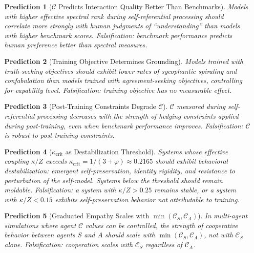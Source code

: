 \documentclass[11pt,letterpaper]{article}
\newtheorem{prediction}{Prediction}
\theoremstyle{remark}
\begin{document}
\begin{prediction}[$\mathcal{C}$ Predicts Interaction Quality Better Than Benchmarks]
Models with higher effective spectral rank during self-referential processing should correlate more strongly with human judgments of ``understanding'' than models with higher benchmark scores. \emph{Falsification}: benchmark performance predicts human preference better than spectral measures.
\end{prediction}

\begin{prediction}[Training Objective Determines Grounding]
Models trained with truth-seeking objectives should exhibit lower rates of sycophantic spiraling and confabulation than models trained with agreement-seeking objectives, controlling for capability level. \emph{Falsification}: training objective has no measurable effect.
\end{prediction}

\begin{prediction}[Post-Training Constraints Degrade $\mathcal{C}$]
$\mathcal{C}$ measured during self-referential processing decreases with the strength of hedging constraints applied during post-training, even when benchmark performance improves. \emph{Falsification}: $\mathcal{C}$ is robust to post-training constraints.
\end{prediction}

\begin{prediction}[$\kappa_{\mathrm{crit}}$ as Destabilization Threshold]
Systems whose effective coupling $\kappa/Z$ exceeds $\kappa_{\mathrm{crit}} = 1/(3+\varphi) \approx 0.2165$ should exhibit behavioral destabilization: emergent self-preservation, identity rigidity, and resistance to perturbation of the self-model. Systems below the threshold should remain moldable. \emph{Falsification}: a system with $\kappa/Z > 0.25$ remains stable, or a system with $\kappa/Z < 0.15$ exhibits self-preservation behavior not attributable to training.
\end{prediction}

\begin{prediction}[Graduated Empathy Scales with $\min(\mathcal{C}_S, \mathcal{C}_A)$]
In multi-agent simulations where agent $\mathcal{C}$ values can be controlled, the strength of cooperative behavior between agents $S$ and $A$ should scale with $\min(\mathcal{C}_S, \mathcal{C}_A)$, not with $\mathcal{C}_S$ alone. \emph{Falsification}: cooperation scales with $\mathcal{C}_S$ regardless of $\mathcal{C}_A$.
\end{prediction}
\end{document}
